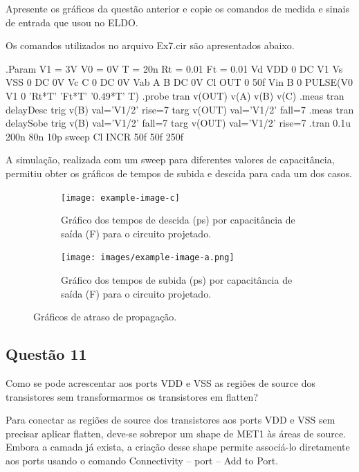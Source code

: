 \documentclass[12pt,a4paper]{article}
\begin{document}
Apresente os gráficos da questão anterior e copie os comandos de medida e sinais de entrada que usou no ELDO.

Os comandos utilizados no arquivo Ex7.cir são apresentados abaixo.

\begin{codeblock}[title={Comandos ELDO}, label={lst:eldo_commands}, listing options={language=TeX}]
.Param V1 = 3V V0 = 0V T = 20n Rt = 0.01 Ft = 0.01
Vd VDD 0 DC V1
Vs VSS 0 DC 0V
Vc C 0 DC 0V
Vab A B DC 0V
Cl OUT 0 50f
Vin B 0 PULSE(V0 V1 0 'Rt*T' 'Ft*T' '0.49*T' T)
.probe tran v(OUT) v(A) v(B) v(C)
.meas tran delayDesc trig v(B) val='V1/2' rise=7 targ v(OUT) val='V1/2'
fall=7
.meas tran delaySobe trig v(B) val='V1/2' fall=7 targ v(OUT) val='V1/2'
rise=7
.tran 0.1u 200n 80n 10p sweep Cl INCR 50f 50f 250f
\end{codeblock}

A simulação, realizada com um sweep para diferentes valores de capacitância, permitiu obter os gráficos de tempos de subida e descida para cada um dos casos.

\begin{figure}[H]
    \centering
    \begin{subfigure}[b]{0.48\textwidth}
        \texttt{[image: example-image-c]}
        \caption{Gráfico dos tempos de descida (ps) por capacitância de saída (F) para o circuito projetado.}
        \label{fig:delay_descida}
    \end{subfigure}
    \hfill
    \begin{subfigure}[b]{0.48\textwidth}
        \texttt{[image: images/example-image-a.png]}
        \caption{Gráfico dos tempos de subida (ps) por capacitância de saída (F) para o circuito projetado.}
        \label{fig:delay_subida}
    \end{subfigure}
    \caption{Gráficos de atraso de propagação.}
    \label{fig:delay_graphs}
\end{figure}

\subsection*{Questão 11}

Como se pode acrescentar aos ports VDD e VSS as regiões de source dos transistores sem transformarmos os transistores em flatten?

Para conectar as regiões de source dos transistores aos ports VDD e VSS sem precisar aplicar flatten, deve-se sobrepor um shape de MET1 às áreas de source. Embora a camada já exista, a criação desse shape permite associá-lo diretamente aos ports usando o comando Connectivity -- port -- Add to Port.
\end{document}
